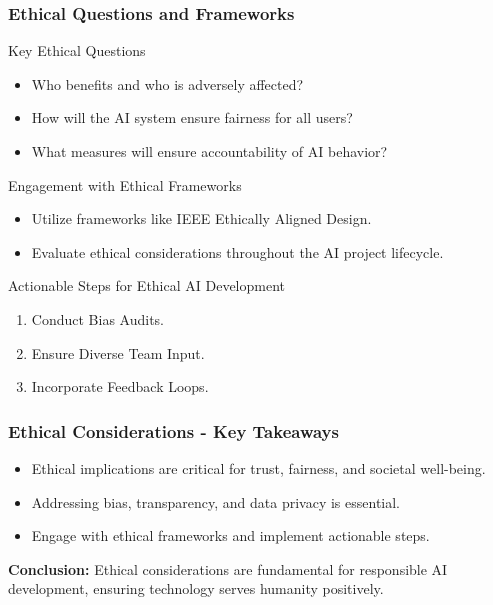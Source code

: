 \documentclass[aspectratio=169]{beamer}
\begin{document}
\begin{frame}[fragile]
    \frametitle{Ethical Questions and Frameworks}
    \begin{block}{Key Ethical Questions}
        \begin{itemize}
            \item Who benefits and who is adversely affected?
            \item How will the AI system ensure fairness for all users?
            \item What measures will ensure accountability of AI behavior?
        \end{itemize}
    \end{block}
    
    \begin{block}{Engagement with Ethical Frameworks}
        \begin{itemize}
            \item Utilize frameworks like IEEE Ethically Aligned Design.
            \item Evaluate ethical considerations throughout the AI project lifecycle.
        \end{itemize}
    \end{block}
    
    \begin{block}{Actionable Steps for Ethical AI Development}
        \begin{enumerate}
            \item Conduct Bias Audits.
            \item Ensure Diverse Team Input.
            \item Incorporate Feedback Loops.
        \end{enumerate}
    \end{block}
\end{frame}

\begin{frame}[fragile]
    \frametitle{Ethical Considerations - Key Takeaways}
    \begin{itemize}
        \item Ethical implications are critical for trust, fairness, and societal well-being.
        \item Addressing bias, transparency, and data privacy is essential.
        \item Engage with ethical frameworks and implement actionable steps.
    \end{itemize}
    
    \textbf{Conclusion:} Ethical considerations are fundamental for responsible AI development, ensuring technology serves humanity positively.
\end{frame}
\end{document}
